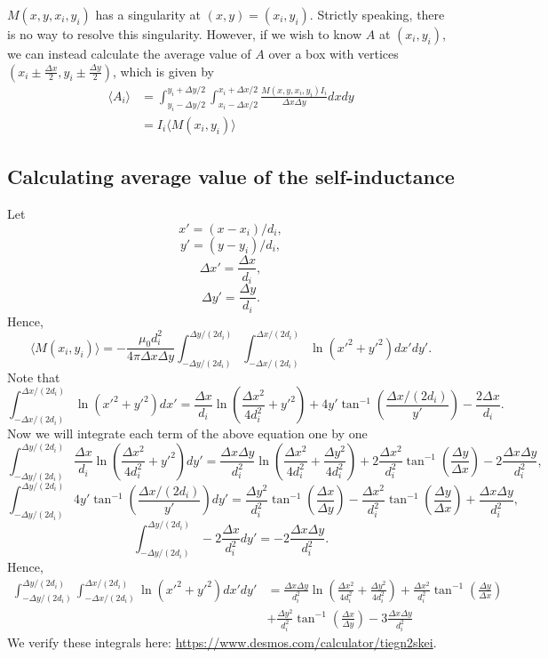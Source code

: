 \documentclass{article}
\begin{document}
$M(x, y, x_i, y_i)$ has a singularity at $(x,y)=(x_i, y_i)$. Strictly speaking, there is no way to resolve this singularity. However, if we wish to know $A$ at $(x_i, y_i)$, we can instead calculate the average value of $A$ over a box with vertices
$\left(x_i \pm \frac{\Delta x}{2}, y_i\pm \frac{\Delta y}{2}\right)$, which is given by
\[\begin{aligned}
\langle A_i\rangle 
&= \int_{y_i-\Delta y /2}^{y_i+\Delta y / 2} \int_{x_i-\Delta x/2}^{x_i+\Delta x / 2}  \frac{M(x, y, x_i, y_i)I_i}{\Delta x\Delta y} dxdy \\
&= I_i \langle M(x_i, y_i) \rangle
\end{aligned}\]

\subsection{Calculating average value of the self-inductance}

Let
\[x'=(x-x_i) / d_i,\]
\[y'= (y-y_i) / d_i,\]
\[\Delta x' = \frac{\Delta x}{d_i},\]
\[\Delta y' = \frac{\Delta y}{d_i}.\]
Hence,
\[\langle M(x_i, y_i) \rangle = -\frac{\mu_0 d_i^2}{4\pi\Delta x\Delta y}\int_{-\Delta y /(2d_i)}^{\Delta y / (2d_i)} \int_{-\Delta x/(2d_i)}^{\Delta x / (2d_i)}  \ln(x'^2+y'^2) dx'dy'.\]
Note that
\[\int_{-\Delta x/(2d_i)}^{\Delta x / (2d_i)}  \ln(x'^2+y'^2) dx' = \frac{\Delta x}{d_i}\ln\left(\frac{\Delta x^2}{4d_i^2} + y'^2\right) + 4y'\tan^{-1}\left(\frac{\Delta x / (2d_i)}{y'}\right) - \frac{2\Delta x}{d_i}.\]
Now we will integrate each term of the above equation one by one
\[\int_{-\Delta y /(2d_i)}^{\Delta y / (2d_i)} \frac{\Delta x}{d_i}\ln\left(\frac{\Delta x^2}{4d_i^2} + y'^2\right) dy' = \frac{\Delta x \Delta y}{d_i^2}\ln\left(\frac{\Delta x^2}{4d_i^2} + \frac{\Delta y^2}{4d_i^2}\right) + 2\frac{\Delta x^2}{d_i^2}\tan^{-1}\left(\frac{\Delta y}{\Delta x}\right) - 2\frac{\Delta x \Delta y}{d_i^2},\]
\[\int_{-\Delta y /(2d_i)}^{\Delta y / (2d_i)} 4y'\tan^{-1}\left(\frac{\Delta x / (2d_i)}{y'}\right) dy' = \frac{\Delta y^2}{d_i^2}\tan^{-1}\left(\frac{\Delta x}{\Delta y}\right)-\frac{\Delta x^2}{d_i^2}\tan^{-1}\left(\frac{\Delta y}{\Delta x}\right) + \frac{\Delta x \Delta y}{d_i^2},\]
\[\int_{-\Delta y /(2d_i)}^{\Delta y / (2d_i)} - 2\frac{\Delta x}{d_i^2} dy' = - 2\frac{\Delta x \Delta y}{d_i^2}.\]
Hence,
\[\begin{aligned}
\int_{-\Delta y /(2d_i)}^{\Delta y / (2d_i)}\int_{-\Delta x/(2d_i)}^{\Delta x / (2d_i)}  \ln(x'^2+y'^2) dx'dy' &= \frac{\Delta x \Delta y}{d_i^2}\ln\left(\frac{\Delta x^2}{4d_i^2} + \frac{\Delta y^2}{4d_i^2}\right) + \frac{\Delta x^2}{d_i^2}\tan^{-1}\left(\frac{\Delta y}{\Delta x}\right) \\
&+  \frac{\Delta y^2}{d_i^2}\tan^{-1}\left(\frac{\Delta x}{\Delta y}\right) - 3\frac{\Delta x \Delta y}{d_i^2}
\end{aligned}\]
We verify these integrals here:
\url{https://www.desmos.com/calculator/tiegn2skei}.
\end{document}
